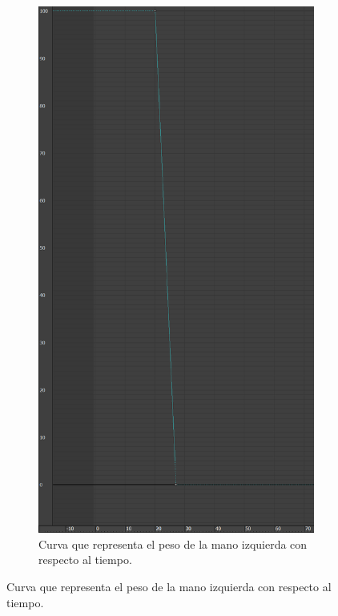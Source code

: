 \begin{figure}[H]
   \centering
   \begin{subfigure}[t]{0.27\textwidth}
       \centering
       \includegraphics[width=\textwidth]{imagenes/espada/peso0.png}
       \caption{Curva que representa el peso de la mano izquierda con respecto al tiempo.}

\end{subfigure}
\end{figure}
